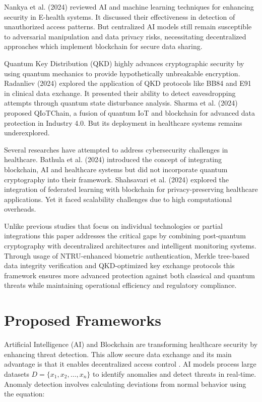 \documentclass[pdflatex,sn-mathphys-num]{sn-jnl}
\theoremstyle{thmstyleone}%
\theoremstyle{thmstyletwo}%
\theoremstyle{thmstylethree}%
\begin{document}
Nankya et al. (2024) \cite{bib10} reviewed AI and machine learning techniques for enhancing security in E-health systems. It discussed their effectiveness in detection of unauthorized access patterns. But centralized AI models still remain susceptible to adversarial manipulation and data privacy risks, necessitating decentralized approaches which implement blockchain for secure data sharing.

Quantum Key Distribution (QKD) highly advances cryptographic security by using quantum mechanics to provide hypothetically unbreakable encryption. Radanliev (2024) \cite{bib11} explored the application of QKD protocols like BB84 and E91 in clinical data exchange. It presented their ability to detect eavesdropping attempts through quantum state disturbance analysis. Sharma et al. (2024) \cite{bib16} proposed QIoTChain, a fusion of quantum IoT and blockchain for advanced data protection in Industry 4.0. But its deployment in healthcare systems remains underexplored.

Several researches have attempted to address cybersecurity challenges in healthcare. Bathula et al. (2024) \cite{bib6} introduced the concept of integrating blockchain, AI and healthcare systems but did not incorporate quantum cryptography into their framework. Shahsavari et al. (2024) \cite{bib9} explored the integration of federated learning with blockchain for privacy-preserving healthcare applications. Yet it faced scalability challenges due to high computational overheads.

 Unlike previous studies that focus on individual technologies or partial integrations this paper addresses the critical gaps by combining post-quantum cryptography with decentralized architectures and intelligent monitoring systems. Through usage of NTRU-enhanced biometric authentication, Merkle tree-based data integrity verification and QKD-optimized key exchange protocols this framework ensures more advanced protection against both classical and quantum threats while maintaining operational efficiency and regulatory compliance.


\section{Proposed Frameworks}
Artificial Intelligence (AI) and Blockchain are transforming healthcare security \cite{bib6} by enhancing threat detection. This allow secure data exchange and its main advantage is that it enables  decentralized access control . AI models process large datasets \(D = \{x_1, x_2, \ldots, x_n\}\) to identify anomalies and detect threats in real-time. Anomaly detection involves calculating deviations from normal behavior using the equation:
\end{document}
